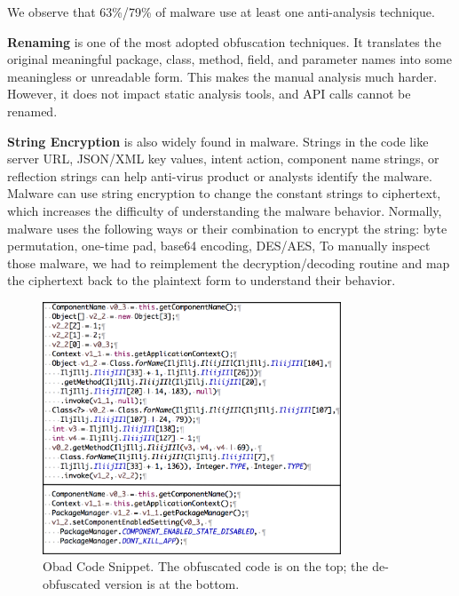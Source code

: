 We observe that 63\%/79\% of malware
use at least one anti-analysis technique.


{\bf Renaming} is one of the most adopted
obfuscation techniques.
It translates the original meaningful package, class, method, field, and parameter names
into some meaningless or unreadable form. 
This makes the manual analysis much harder.
However, it does not impact static analysis tools, and API calls cannot
be renamed.


{\bf String Encryption} is also widely found in malware. Strings in the code
like server URL, JSON/XML key values,
intent action, component name strings, or reflection strings can help
anti-virus product or analysts identify the malware.
Malware can use string encryption to change the constant strings 
to ciphertext, which increases the difficulty of understanding the
malware behavior.
Normally, malware uses the following ways or 
their combination to encrypt the string: byte permutation, one-time pad,
base64 encoding, DES/AES, \etc
To manually inspect those malware, we had to reimplement
the decryption/decoding routine and map the ciphertext back to the plaintext form
to understand their behavior.

\begin{figure}[t]
\centering
\includegraphics[width=3.5in]{fig/obadCodeSnippet.png}
\vspace{-.05in}
\caption{Obad Code Snippet. The obfuscated code is on the top; 
the de-obfuscated version is at the bottom.}
\label{fig:obadCodeSnippet}
\vspace{-.15in}
\end{figure}


